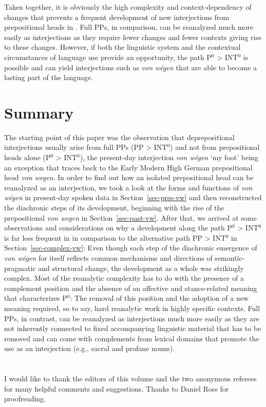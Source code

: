 \documentclass[output=paper
  ,nobabel
  ,draftmode
  ,babelshorthands
  ,colorlinks, citecolor=brown
]{langscibook}
\begin{document}
\noindent
Taken together, it is obviously the high complexity and context-dependency of changes that prevents a frequent development of new interjections from prepositional heads in . Full PPs, in comparison, can be reanalyzed much more easily as interjections as they require fewer changes and fewer contexts giving rise to these changes. However, if both the linguistic system and the contextual circumstances of language use provide an opportunity, the path P$^0$ > INT$^0$ is possible and can yield interjections such as \emph{von wégen} that are able to become a lasting part of the language.

\section{Summary}\label{sec-summ-büc}
The starting point of this paper was the observation that  deprepositional interjections usually arise from full PPs (PP > INT$^0$) and not from prepositional heads alone (P$^0$ > INT$^0$), the present-day  interjection \emph{von wégen} ‘my foot’ being an exception that traces back to the Early Modern High German prepositional head \emph{von wegen}. In order to find out how an isolated prepositional head can be reanalyzed as an interjection, we took a look at the forms and functions of \emph{von wégen} in present-day  spoken data in Section~\ref{sec-pres-vw} and then reconstructed the diachronic steps of its development, beginning with the rise of the prepositional \emph{von wegen} in Section~\ref{sec-past-vw}. After that, we arrived at some observations and considerations on why a development along the path P$^0$ > INT$^0$ is far less frequent in  in comparison to the alternative path PP > INT$^0$ in Section~\ref{sec-complex-vw}: Even though each step of the diachronic emergence of \emph{von wégen} for itself reflects common mechanisms and directions of semantic-pragmatic and structural change, the development as a whole was strikingly complex. Most of the reanalytic complexity has to do with the presence of a complement position and the absence of an affective and stance-related meaning that characterizes P$^0$: The removal of this position and the adoption of a new meaning required, so to say, hard reanalytic work in highly specific contexts. Full PPs, in contrast, can be reanalyzed as interjections much more easily as they are not inherently connected to fixed accompanying linguistic material that has to be removed and can come with complements from lexical domains that promote the use as an interjection (e.g., sacral and profane nouns).

\section*{\acknowledgmentsUS}
I would like to thank the editors of this volume and the two anonymous referees for many helpful comments and suggestions. Thanks to Daniel Ross for proofreading.

{\sloppy
\printbibliography[heading=subbibliography,notkeyword=this]
}
\end{document}
